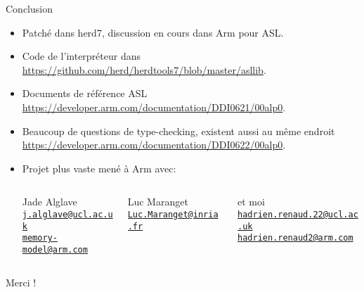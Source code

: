 \documentclass[10pt, dvipsnames]{beamer}
\newcommand\mailto[1]{\href{mailto:#1}{\nolinkurl{#1}}}
\begin{document}
\begin{frame}{Conclusion}
  \begin{itemize}
    \item Patch\'e dans herd7, discussion en cours dans Arm pour ASL.

    \vfill
    \item Code de l'interpr\'eteur dans
      \url{https://github.com/herd/herdtools7/blob/master/asllib}.

    \vfill
    \item Documents de r\'ef\'erence ASL
      \url{https://developer.arm.com/documentation/DDI0621/00alp0}.

    \vfill
    \item Beaucoup de questions de type-checking, existent aussi au m\^eme endroit
      \url{https://developer.arm.com/documentation/DDI0622/00alp0}.

    \vfill
    \item
        Projet plus vaste men\'e \`a Arm avec:
        \vspace{1em}
        \begin{columns}[T]
          \begin{column}{.3\textwidth}
            \centering
            Jade Alglave \\
            \footnotesize\mailto{j.alglave@ucl.ac.uk} \\
            \footnotesize\mailto{memory-model@arm.com} \\
          \end{column}
          \begin{column}{.3\textwidth}
            \centering
            Luc Maranget \\
            \footnotesize\mailto{Luc.Maranget@inria.fr} \\
          \end{column}
          \begin{column}{.35\textwidth}
            \centering
            et moi \\
            \footnotesize\mailto{hadrien.renaud.22@ucl.ac.uk} \\
            \footnotesize\mailto{hadrien.renaud2@arm.com} \\
          \end{column}
        \end{columns}
  \end{itemize}
\end{frame}

\begin{frame}
  \centering
  \huge%
  Merci !
\end{frame}
\end{document}
